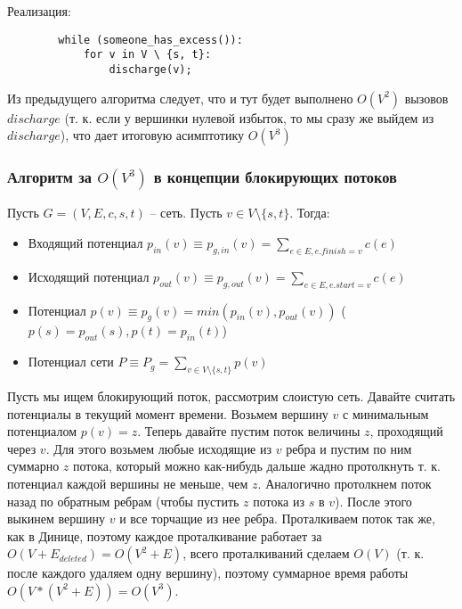 \begin{algorithm}
    Реализация:
    \begin{lstlisting}
        while (someone_has_excess()):
            for v in V \ {s, t}:
                discharge(v);
    \end{lstlisting}
    Из предыдущего алгоритма следует, что и тут будет выполнено $O(V^2)$ вызовов $discharge$ (т. к. если у вершинки нулевой избыток, то мы сразу же выйдем из $discharge$), что дает итоговую асимптотику $O(V^3)$
\end{algorithm}

\subsubsection{Алгоритм за $O(V^3)$ в концепции блокирующих потоков}

\begin{reminder}
    \begin{definition}
        Пусть $G = (V, E, c, s, t)$ -- сеть. Пусть $v \in V \setminus \{s, t\}$. Тогда:
        \begin{itemize}
            \item Входящий потенциал $p_{in}(v) \equiv p_{g, in}(v) = \sum_{e \in E, e.finish = v}c(e)$
            \item Исходящий потенциал $p_{out}(v) \equiv p_{g, out}(v) = \sum_{e \in E, e.start = v}c(e)$
            \item Потенциал $p(v) \equiv p_{g}(v) = min(p_{in}(v), p_{out}(v))$ ($p(s) = p_{out}(s), p(t) = p_{in}(t)$)
            \item Потенциал сети $P \equiv P_{g} = \sum_{v \in V \setminus \{s, t\}}p(v)$
        \end{itemize}
    \end{definition}
\end{reminder}

\begin{algorithm}
    Пусть мы ищем блокирующий поток, рассмотрим слоистую сеть. Давайте считать потенциалы в текущий момент времени. Возьмем вершину $v$ с минимальным потенциалом $p(v) = z$. Теперь давайте пустим поток величины $z$, проходящий через $v$. Для этого возьмем любые исходящие из $v$ ребра и пустим по ним суммарно $z$ потока, который можно как-нибудь дальше жадно протолкнуть т. к. потенциал каждой вершины не меньше, чем $z$. Аналогично протолкнем поток назад по обратным ребрам (чтобы пустить $z$ потока из $s$ в $v$). После этого выкинем вершину $v$ и все торчащие из нее ребра. Проталкиваем поток так же, как в Динице, поэтому каждое проталкивание работает за $O(V + E_{deleted}) = O(V^2 + E)$, всего проталкиваний сделаем $O(V)$ (т. к. после каждого удаляем одну вершину), поэтому суммарное время работы $O(V * (V^2 + E)) = O(V^3)$.
\end{algorithm}

